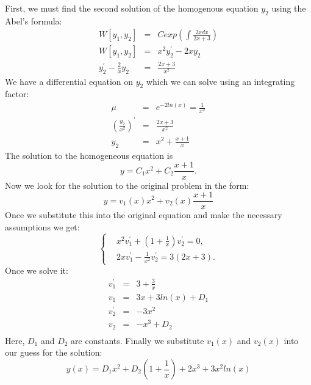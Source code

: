 \documentclass[11pt]{article}
\begin{document}
\begin{solution}
  First, we must find the second solution of the homogenous equation $y_2$ using the Abel's
  formula:
  \begin{eqnarray*}
    W[y_1, y_2] & = & C exp \left( \int \frac {2x dx} {2x + 3} \right) \\
    W[y_1, y_2] & = & x^2 y_2^{\prime} - 2 x y_2 \\
    y_2^{\prime} - \frac {2} {x} y_2 & = & \frac {2x + 3} {x^2}
  \end{eqnarray*}
  We have a differential equation on $y_2$ which we can solve using an integrating factor:
  \begin{eqnarray*}
    \mu & = & e ^{-2ln(x)} = \frac {1} {x^2} \\
    \left( \frac {y_2} {x^2} \right)^{\prime} & = & \frac {2x + 3} {x^2} \\
    y_2 & = & x^2 + \frac {x + 1} {x}
  \end{eqnarray*}
  The solution to the homogeneous equation is
  \[y = C_1 x^2 + C_2 \frac {x+1} {x}. \]
  Now we look for the solution to the original problem in the form:
  \[ y = v_1(x) x^2 + v_2(x) \frac {x+1} {x} \]
  Once we substitute this into the original equation and make the necessary assumptions
  we get:
  \begin{equation}
    \left \{
    \begin{aligned}
      & x^2 v_1^{\prime} + \left( 1 + \frac {1} {x} \right) v_2^{\prime} = 0, \\
      & 2x v_1^{\prime} - \frac {1} {x^2} v_2^{\prime} = 3 \left( 2x + 3 \right).
    \end{aligned}
    \right.
  \end{equation}
  Once we solve it:
  \begin{eqnarray*}
    v_1^{\prime} & = & 3 + \frac {3} {x} \\
    v_1 & = & 3x + 3ln(x) + D_1 \\
    v_2^{\prime} & = & -3x^2 \\
    v_2 & = & -x^3 + D_2 \\
  \end{eqnarray*}
  Here, $D_1$ and $D_2$ are constants. Finally we substitute $v_1(x)$ and $v_2(x)$
  into our guess for the solution:
  \begin{equation*}
    \boxed{y(x) = D_1 x^2 + D_2 \left( 1 + \frac {1} {x} \right) + 2x^3 + 3x^2 ln(x)  } 
  \end{equation*}
\end{solution}
\end{document}
